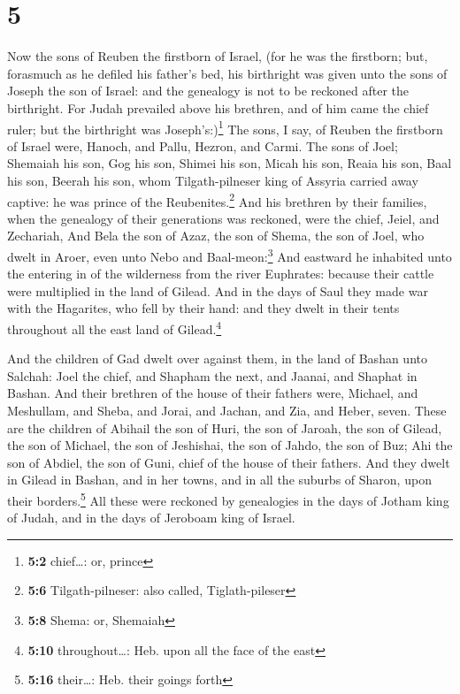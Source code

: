 \hypertarget{section-4}{%
\section{5}\label{section-4}}

 Now the sons of Reuben the firstborn of Israel, (for he
was the firstborn; but, forasmuch as he defiled his father's bed, his
birthright was given unto the sons of Joseph the son of Israel: and the
genealogy is not to be reckoned after the birthright.  For
Judah prevailed above his brethren, and of him came the chief ruler; but
the birthright was Joseph's:)\footnote{\textbf{5:2} chief\ldots: or,
  prince}  The sons, I say, of Reuben the firstborn of
Israel were, Hanoch, and Pallu, Hezron, and Carmi.  The
sons of Joel; Shemaiah his son, Gog his son, Shimei his son,
 Micah his son, Reaia his son, Baal his son,
 Beerah his son, whom Tilgath-pilneser king of Assyria
carried away captive: he was prince of the Reubenites.\footnote{\textbf{5:6}
  Tilgath-pilneser: also called, Tiglath-pileser}  And his
brethren by their families, when the genealogy of their generations was
reckoned, were the chief, Jeiel, and Zechariah,  And Bela
the son of Azaz, the son of Shema, the son of Joel, who dwelt in Aroer,
even unto Nebo and Baal-meon:\footnote{\textbf{5:8} Shema: or, Shemaiah}
 And eastward he inhabited unto the entering in of the
wilderness from the river Euphrates: because their cattle were
multiplied in the land of Gilead.  And in the days of
Saul they made war with the Hagarites, who fell by their hand: and they
dwelt in their tents throughout all the east land of Gilead.\footnote{\textbf{5:10}
  throughout\ldots: Heb. upon all the face of the east}

 And the children of Gad dwelt over against them, in the
land of Bashan unto Salchah:  Joel the chief, and Shapham
the next, and Jaanai, and Shaphat in Bashan.  And their
brethren of the house of their fathers were, Michael, and Meshullam, and
Sheba, and Jorai, and Jachan, and Zia, and Heber, seven. 
These are the children of Abihail the son of Huri, the son of Jaroah,
the son of Gilead, the son of Michael, the son of Jeshishai, the son of
Jahdo, the son of Buz;  Ahi the son of Abdiel, the son of
Guni, chief of the house of their fathers.  And they
dwelt in Gilead in Bashan, and in her towns, and in all the suburbs of
Sharon, upon their borders.\footnote{\textbf{5:16} their\ldots: Heb.
  their goings forth}  All these were reckoned by
genealogies in the days of Jotham king of Judah, and in the days of
Jeroboam king of Israel.

